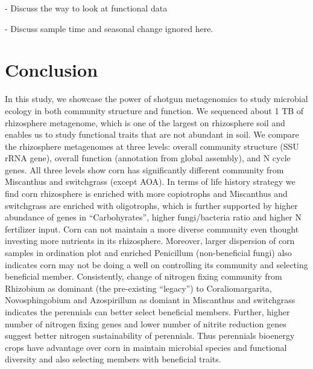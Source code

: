 \documentclass[12pt]{article}
\begin{document}
- Discuss the way to look at functional data

- Discuss sample time and seasonal change ignored here.

\section{Conclusion}
In this study, we showcase the power of shotgun metagenomics to study microbial ecology in both community structure and function. We sequenced about 1 TB of rhizosphere metagenome, which is one of the largest on rhizosphere soil and enables us to study functional traits that are not abundant in soil. We compare the rhizosphere metagenomes at three levels: overall community structure (SSU rRNA gene), overall function (annotation from global assembly), and N cycle genes. All three levels show corn has significantly different community from Miscanthus and switchgrass (except AOA). In terms of life history strategy we find corn rhizosphere is enriched with more copiotrophs and Miscanthus and switchgrass are enriched with oligotrophs, which is further supported by higher abundance of genes in ``Carbohyrates'', higher fungi/bacteria ratio and higher N fertilizer input. Corn can not maintain a more diverse community even thought investing more nutrients in its rhizosphere. Moreover, larger dispersion of corn samples in ordination plot and enriched Penicillum (non-beneficial fungi) also indicates corn may not be doing a well on controlling its community and selecting beneficial member. Consistently, change of nitrogen fixing community from Rhizobium as dominant (the pre-existing ``legacy'')  to Coraliomargarita, Novosphingobium and Azospirillum as domiant in Miscanthus and switchgrass indicates the perennials can better select beneficial members. Further, higher number of nitrogen fixing genes and lower number of nitrite reduction genes suggest better nitrogen sustainability of perennials. Thus perennials bioenergy crops have advantage over corn in maintain microbial species and functional diversity and also selecting members with beneficial traits.


 
\end{document}
